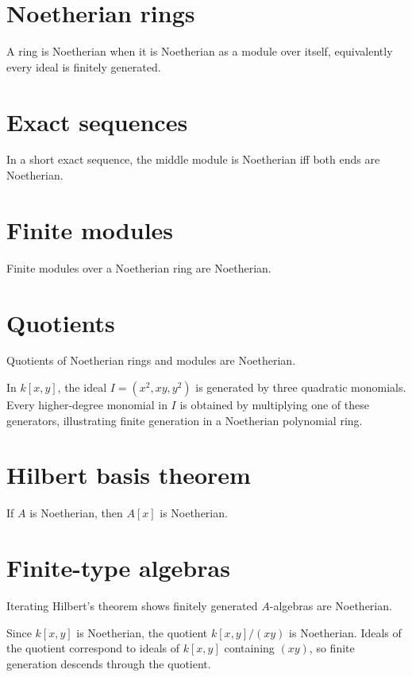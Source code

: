 \section{Noetherian rings}
A ring is Noetherian when it is Noetherian as a module over itself, equivalently every ideal is finitely generated.

\section{Exact sequences}
In a short exact sequence, the middle module is Noetherian iff both ends are Noetherian.

\section{Finite modules}
Finite modules over a Noetherian ring are Noetherian.

\section{Quotients}
Quotients of Noetherian rings and modules are Noetherian.

\begin{example}\label{ex:v15-expand-02}
In $k[x,y]$, the ideal $I=(x^2,xy,y^2)$ is generated by three quadratic monomials. Every higher-degree monomial in $I$ is obtained by multiplying one of these generators, illustrating finite generation in a Noetherian polynomial ring.
\end{example}
\section{Hilbert basis theorem}
If $A$ is Noetherian, then $A[x]$ is Noetherian.

\section{Finite-type algebras}
Iterating Hilbert's theorem shows finitely generated $A$-algebras are Noetherian.

\begin{example}\label{ex:v15-expand-03}
Since $k[x,y]$ is Noetherian, the quotient $k[x,y]/(xy)$ is Noetherian. Ideals of the quotient correspond to ideals of $k[x,y]$ containing $(xy)$, so finite generation descends through the quotient.
\end{example}
